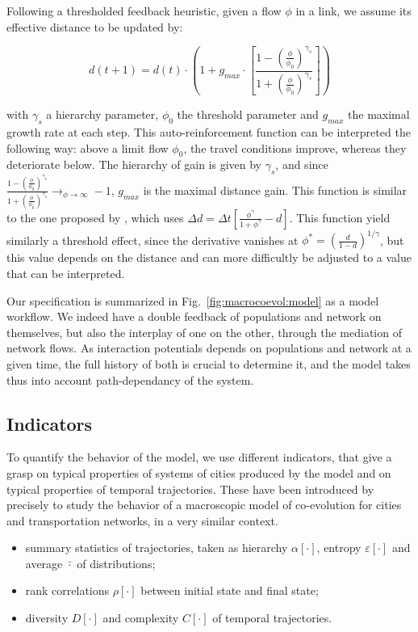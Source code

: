 \documentclass[11pt]{article}
\begin{document}
Following a thresholded feedback heuristic, given a flow $\phi$ in a link, we assume its effective distance to be updated by:

\begin{equation}
d(t+1) = d(t)\cdot \left( 1 + g_{max} \cdot \left[\frac{1 - \left(\frac{\phi}{\phi_0}\right)^{\gamma_s}}{1 + \left(\frac{\phi}{\phi_0}\right)^{\gamma_s}}\right]\right)
\end{equation}

with $\gamma_s$ a hierarchy parameter, $\phi_0$ the threshold parameter and $g_{max}$ the maximal growth rate at each step. This auto-reinforcement function can be interpreted the following way: above a limit flow $\phi_0$, the travel conditions improve, whereas they deteriorate below. The hierarchy of gain is given by $\gamma_s$, and since $\frac{1 - \left(\frac{\phi}{\phi_0}\right)^{\gamma_s}}{1 + \left(\frac{\phi}{\phi_0}\right)^{\gamma_s}} \rightarrow_{\phi\rightarrow \infty} -1$, $g_{max}$ is the maximal distance gain. This function is similar to the one proposed by \cite{tero2007mathematical}, which uses $\Delta d = \Delta t \left[ \frac{\phi^\gamma}{1 + \phi^\gamma} - d\right]$. This function yield similarly a threshold effect, since the derivative vanishes at $\phi^{\ast} = \left(\frac{d}{1 - d}\right)^{1/\gamma}$, but this value depends on the distance and can more difficultly be adjusted to a value that can be interpreted.


Our specification is summarized in Fig.~\ref{fig:macrocoevol:model} as a model workflow. We indeed have a double feedback of populations and network on themselves, but also the interplay of one on the other, through the mediation of network flows. As interaction potentials depends on populations and network at a given time, the full history of both is crucial to determine it, and the model takes thus into account path-dependancy of the system.



\subsection{Indicators}

To quantify the behavior of the model, we use different indicators, that give a grasp on typical properties of systems of cities produced by the model and on typical properties of temporal trajectories. These have been introduced by \cite{2018arXiv180900861R} precisely to study the behavior of a macroscopic model of co-evolution for cities and transportation networks, in a very similar context.
\begin{itemize}
	\item summary statistics of trajectories, taken as hierarchy $\alpha\left[\cdot\right]$, entropy $\varepsilon\left[\cdot\right]$ and average $\bar{\cdot}$ of distributions;
	\item rank correlations $\rho\left[\cdot\right]$ between initial state and final state;
	\item diversity $D\left[\cdot\right]$ and complexity $C\left[\cdot\right]$ of temporal trajectories.
\end{itemize}
\end{document}
